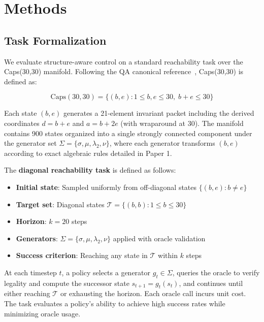 
\section{Methods}

\subsection{Task Formalization}

We evaluate structure-aware control on a standard reachability task over the Caps(30,30) manifold. Following the QA canonical reference~\cite{qa_canonical}, Caps(30,30) is defined as:

\begin{equation}
\text{Caps}(30,30) = \{(b,e) : 1 \le b,e \le 30, \; b+e \le 30\}
\end{equation}

Each state $(b,e)$ generates a 21-element invariant packet including the derived coordinates $d = b+e$ and $a = b+2e$ (with wraparound at 30). The manifold contains 900 states organized into a single strongly connected component under the generator set $\Sigma = \{\sigma, \mu, \lambda_2, \nu\}$, where each generator transforms $(b,e)$ according to exact algebraic rules detailed in Paper 1.

The \textbf{diagonal reachability task} is defined as follows:

\begin{itemize}
\item \textbf{Initial state}: Sampled uniformly from off-diagonal states $\{(b,e) : b \ne e\}$
\item \textbf{Target set}: Diagonal states $\mathcal{T} = \{(b,b) : 1 \le b \le 30\}$
\item \textbf{Horizon}: $k = 20$ steps
\item \textbf{Generators}: $\Sigma = \{\sigma, \mu, \lambda_2, \nu\}$ applied with oracle validation
\item \textbf{Success criterion}: Reaching any state in $\mathcal{T}$ within $k$ steps
\end{itemize}

At each timestep $t$, a policy selects a generator $g_t \in \Sigma$, queries the oracle to verify legality and compute the successor state $s_{t+1} = g_t(s_t)$, and continues until either reaching $\mathcal{T}$ or exhausting the horizon. Each oracle call incurs unit cost. The task evaluates a policy's ability to achieve high success rates while minimizing oracle usage.


